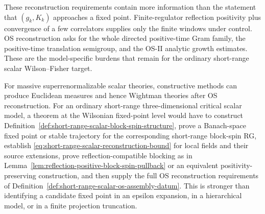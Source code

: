 These reconstruction requirements contain more information than the statement that
\((g_k,K_k)\) approaches a fixed point.  Finite-regulator reflection
positivity plus convergence of a few correlators supplies only the finite
windows under control.  OS reconstruction asks for the whole directed
positive-time Gram family, the positive-time translation semigroup, and the
OS-II analytic growth estimates.  These are the
model-specific burdens that remain for the ordinary short-range scalar
Wilson--Fisher target.

\begin{remark}
\label{rem:ordinary-scalar-target-status}
For massive superrenormalizable scalar theories, constructive methods can
produce Euclidean measures and hence Wightman theories after OS
reconstruction.  For an ordinary short-range three-dimensional critical
scalar model, a theorem at the Wilsonian fixed-point level would have to
construct Definition~\ref{def:short-range-scalar-block-spin-structure}, prove a
Banach-space fixed point or stable trajectory for the corresponding
short-range block-spin RG, establish
\eqref{eq:short-range-scalar-reconstruction-bound} for local fields and
their source extensions, prove reflection-compatible blocking as in
Lemma~\ref{lem:reflection-positive-block-spin-pullback} or an equivalent
positivity-preserving construction, and then supply the full
OS reconstruction requirements of
Definition~\ref{def:short-range-scalar-os-assembly-datum}.  This is stronger
than identifying a
candidate fixed point in an epsilon expansion, in a hierarchical model, or
in a finite projection truncation.
\end{remark}

